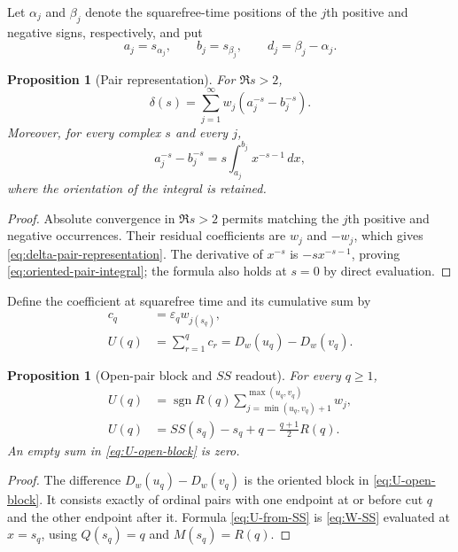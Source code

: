 \documentclass[11pt]{amsart}
\numberwithin{equation}{section}
\theoremstyle{plain}
\newtheorem{proposition}[theorem]{Proposition}
\theoremstyle{definition}
\theoremstyle{remark}
\newcommand{\sgn}{\operatorname{sgn}}
\begin{document}
Let $\alpha_j$ and $\beta_j$ denote the squarefree-time positions of the
$j$th positive and negative signs, respectively, and put
\begin{equation}
a_j=s_{\alpha_j},\qquad b_j=s_{\beta_j},
\qquad d_j=\beta_j-\alpha_j.
\label{eq:ordinal-pairs}
\end{equation}

\begin{proposition}[Pair representation]
\label{prop:pair-representation}
For $\Re s>2$,
\begin{equation}
\delta(s)=\sum_{j=1}^{\infty}w_j
\left(a_j^{-s}-b_j^{-s}\right).
\label{eq:delta-pair-representation}
\end{equation}
Moreover, for every complex $s$ and every $j$,
\begin{equation}
a_j^{-s}-b_j^{-s}
=s\int_{a_j}^{b_j}x^{-s-1}\,dx,
\label{eq:oriented-pair-integral}
\end{equation}
where the orientation of the integral is retained.
\end{proposition}

\begin{proof}
Absolute convergence in $\Re s>2$ permits matching the $j$th positive and
negative occurrences.  Their residual coefficients are $w_j$ and $-w_j$,
which gives \eqref{eq:delta-pair-representation}.  The derivative of
$x^{-s}$ is $-sx^{-s-1}$, proving \eqref{eq:oriented-pair-integral}; the
formula also holds at $s=0$ by direct evaluation.
\end{proof}

Define the coefficient at squarefree time and its cumulative sum by
\begin{align}
c_q&=\varepsilon_q w_{j(s_q)},
\label{eq:cq-definition}\\
U(q)&=\sum_{r=1}^{q}c_r
=D_w(u_q)-D_w(v_q).
\label{eq:U-definition}
\end{align}

\begin{proposition}[Open-pair block and $SS$ readout]
\label{prop:U-open-block}
For every $q\ge1$,
\begin{align}
U(q)&=\sgn R(q)
\sum_{j=\min(u_q,v_q)+1}^{\max(u_q,v_q)}w_j,
\label{eq:U-open-block}\\
U(q)&=SS(s_q)-s_q+q-\frac{q+1}{2}R(q).
\label{eq:U-from-SS}
\end{align}
An empty sum in \eqref{eq:U-open-block} is zero.
\end{proposition}

\begin{proof}
The difference $D_w(u_q)-D_w(v_q)$ is the oriented block in
\eqref{eq:U-open-block}.  It consists exactly of ordinal pairs with one
endpoint at or before cut $q$ and the other endpoint after it.  Formula
\eqref{eq:U-from-SS} is \eqref{eq:W-SS} evaluated at $x=s_q$, using
$Q(s_q)=q$ and $M(s_q)=R(q)$.
\end{proof}
\end{document}
